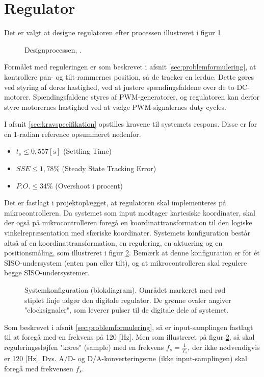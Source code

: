 \section{Regulator}
\label{sec:kontrollerdeign}
Det er valgt at designe regulatoren efter processen illustreret i figur \ref{fig:designproces}.
\begin{figure}[!th]
\centering

\caption[Designprocessen]{Designprocessen, \citep[Side. 260]{reg_modern_control_systems}.}
\label{fig:designproces}
\end{figure}

Formålet med reguleringen er som beskrevet i afsnit \ref{sec:problemformulering},
at kontrollere pan- og tilt-rammernes position, så de tracker en lerdue.
Dette gøres ved styring af deres hastighed, ved at justere spændingsfaldene over de
to DC-motorer. Spændingsfaldene styres af PWM-generatorer, og regulatoren
kan derfor styre motorernes hastighed ved at vælge PWM-signalernes duty cycles.

I afsnit \ref{sec:kravspecifikation} opstilles kravene til systemets respons.
Disse er for en 1-radian reference opsummeret nedenfor.
\begin{itemize}
\itemsep1pt
\item \(t_{s} \leq 0,557 \mathrm{\left[s\right]}\) (Settling Time)
\item \(SSE \leq 1,78 \%\) (Steady State Tracking Error)
\item \(P.O. \leq 34 \%\) (Overshoot i procent)
\end{itemize}

Det er fastlagt i projektoplægget, at regulatoren skal implementeres på mikrocontrolleren.
Da systemet som input modtager kartesiske koordinater,
skal der også på mikrocontrolleren foregå en koordinattransformation
til den logiske vinkelrepræsentation med sfæriske koordinater.
Systemets konfiguration består altså af en koordinattransformation,
en regulering, en aktuering og en positionsmåling, som illustreret
i figur \ref{fig:digitalkontroller1}.
Bemærk at denne konfiguration er for ét SISO-undersystem (enten pan eller tilt),
og at mikrocontrolleren skal regulere begge SISO-undersystemer.
\begin{figure}[!th]
\centering
\begin{tikzpicture}[auto, node distance=2.6cm,>=latex']

\end{tikzpicture}
\caption[Systemkonfiguration]{Systemkonfiguration (blokdiagram).
	Området markeret med rød stiplet linje udgør den digitale regulator.
	De grønne ovaler angiver "clocksignaler", som leverer pulser til de digitale dele af systemet.}
\label{fig:digitalkontroller1}
\end{figure}
Som beskrevet i afsnit \ref{sec:problemformulering},
så er input-samplingen fastlagt til at foregå med en frekvens på 120 [Hz].
Men som illustreret på figur \ref{fig:digitalkontroller1}, så skal reguleringssløjfen
"køres" (sample) med en frekvens \(f_s=\frac{1}{T_s}\), der ikke nødvendigvis er 120 [Hz].
Dvs. A/D- og D/A-konverteringerne (ikke input-samplingen) skal foregå med frekvensen \(f_s\).

